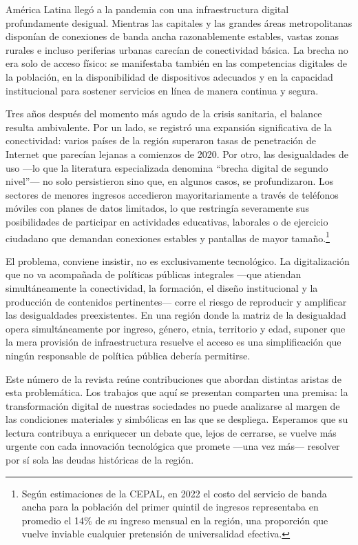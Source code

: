 América Latina llegó a la pandemia con una infraestructura digital profundamente desigual. Mientras las capitales y las grandes áreas metropolitanas disponían de conexiones de banda ancha razonablemente estables, vastas zonas rurales e incluso periferias urbanas carecían de conectividad básica. La brecha no era solo de acceso físico: se manifestaba también en las competencias digitales de la población, en la disponibilidad de dispositivos adecuados y en la capacidad institucional para sostener servicios en línea de manera continua y segura.

Tres años después del momento más agudo de la crisis sanitaria, el balance resulta ambivalente. Por un lado, se registró una expansión significativa de la conectividad: varios países de la región superaron tasas de penetración de Internet que parecían lejanas a comienzos de 2020. Por otro, las desigualdades de uso —lo que la literatura especializada denomina “brecha digital de segundo nivel”— no solo persistieron sino que, en algunos casos, se profundizaron. Los sectores de menores ingresos accedieron mayoritariamente a través de teléfonos móviles con planes de datos limitados, lo que restringía severamente sus posibilidades de participar en actividades educativas, laborales o de ejercicio ciudadano que demandan conexiones estables y pantallas de mayor tamaño.\footnote{Según estimaciones de la CEPAL, en 2022 el costo del servicio de
banda ancha para la población del primer quintil de ingresos
representaba en promedio el 14\% de su ingreso mensual en la región, una
proporción que vuelve inviable cualquier pretensión de universalidad
efectiva.}

El problema, conviene insistir, no es exclusivamente tecnológico. La digitalización que no va acompañada de políticas públicas integrales —que atiendan simultáneamente la conectividad, la formación, el diseño institucional y la producción de contenidos pertinentes— corre el riesgo de reproducir y amplificar las desigualdades preexistentes. En una región donde la matriz de la desigualdad opera simultáneamente por ingreso, género, etnia, territorio y edad, suponer que la mera provisión de infraestructura resuelve el acceso es una simplificación que ningún responsable de política pública debería permitirse.

Este número de la revista reúne contribuciones que abordan distintas aristas de esta problemática. Los trabajos que aquí se presentan comparten una premisa: la transformación digital de nuestras sociedades no puede analizarse al margen de las condiciones materiales y simbólicas en las que se despliega. Esperamos que su lectura contribuya a enriquecer un debate que, lejos de cerrarse, se vuelve más urgente con cada innovación tecnológica que promete —una vez más— resolver por sí sola las deudas históricas de la región.

